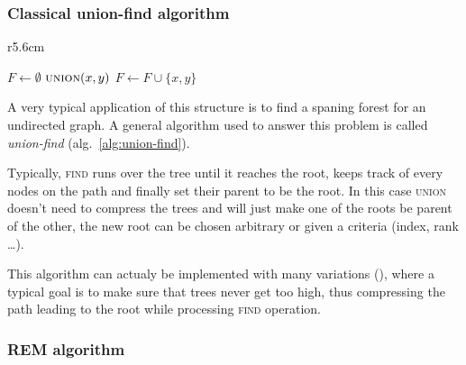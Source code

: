 \documentclass[12px]{article}
\begin{document}
      \subsubsection{Classical union-find algorithm}
        \setlength\intextsep{0pt}
        \begin{wrapfigure}{r}{5.6cm}
          \centering
          \begin{minipage}{\linewidth}
            \begin{algorithm}[H]
              \caption{General structure of Union-Find}%
              \label{alg:union-find}
              \begin{algorithmic}[1]
                \State $F \gets \emptyset$
                  \State {}
                \EndFor
                    \State $\Call{union}{x, y}$
                    \State $F \gets F \cup \{x, y\}$
                  \EndIf
                \EndFor
              \end{algorithmic}
            \end{algorithm}
          \end{minipage}
        \end{wrapfigure}

        A very typical application of this structure is to find a spaning forest for an undirected graph. 
        A general algorithm used to answer this problem is called \emph{union-find} (alg.~\ref{alg:union-find}).

        Typically, \textsc{find} runs over the tree until it reaches the root, keeps track of every nodes on the path and finally set their parent to be the root. In this case \textsc{union} doesn't need to compress the trees and will just make one of the roots be parent of the other, the new root can be chosen arbitrary or given a criteria (index, rank \dots).

        This algorithm can actualy be implemented with many variations (), where a typical goal is to make sure that trees never get too high, thus compressing the path leading to the root while processing \textsc{find} operation.


      \subsubsection{REM algorithm}
\end{document}
